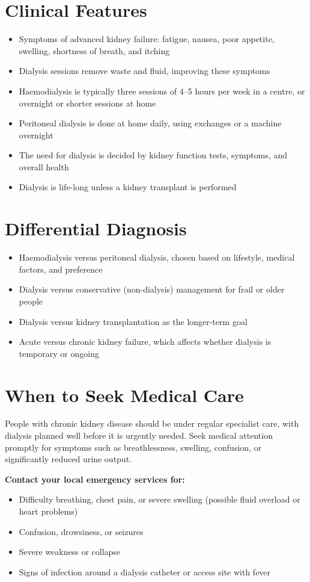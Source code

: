 \section*{Clinical Features}
\begin{itemize}
    \item Symptoms of advanced kidney failure: fatigue, nausea, poor appetite, swelling, shortness of breath, and itching
    \item Dialysis sessions remove waste and fluid, improving these symptoms
    \item Haemodialysis is typically three sessions of 4--5 hours per week in a centre, or overnight or shorter sessions at home
    \item Peritoneal dialysis is done at home daily, using exchanges or a machine overnight
    \item The need for dialysis is decided by kidney function tests, symptoms, and overall health
    \item Dialysis is life-long unless a kidney transplant is performed
\end{itemize}

\section*{Differential Diagnosis}
\begin{itemize}
    \item Haemodialysis versus peritoneal dialysis, chosen based on lifestyle, medical factors, and preference
    \item Dialysis versus conservative (non-dialysis) management for frail or older people
    \item Dialysis versus kidney transplantation as the longer-term goal
    \item Acute versus chronic kidney failure, which affects whether dialysis is temporary or ongoing
\end{itemize}

\section*{When to Seek Medical Care}
People with chronic kidney disease should be under regular specialist care, with dialysis planned well before it is urgently needed. Seek medical attention promptly for symptoms such as breathlessness, swelling, confusion, or significantly reduced urine output.

\textbf{Contact your local emergency services for:}
\begin{itemize}
    \item Difficulty breathing, chest pain, or severe swelling (possible fluid overload or heart problems)
    \item Confusion, drowsiness, or seizures
    \item Severe weakness or collapse
    \item Signs of infection around a dialysis catheter or access site with fever
\end{itemize}

